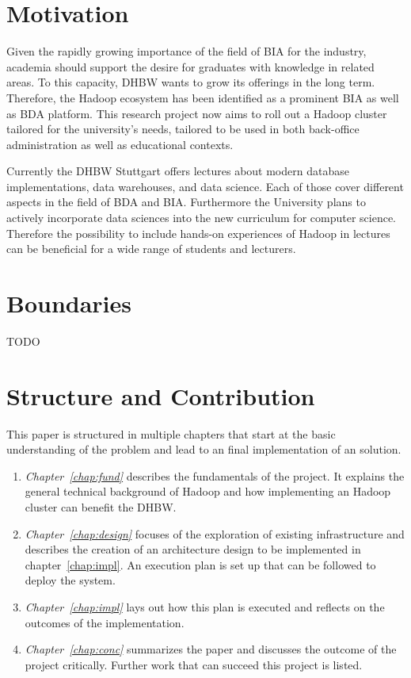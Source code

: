 \section{Motivation}
\label{sec:intro:motivation}

Given the rapidly growing importance of the field of \ac{BIA} for the industry, academia
should support the desire for graduates with knowledge in related areas. To this capacity,
\ac{DHBW} wants to grow its offerings in the long term. Therefore, the Hadoop ecosystem has
been identified as a prominent \ac{BIA} as well as \ac{BDA} platform. This research project now
aims to roll out a Hadoop cluster tailored for the university’s needs, tailored to be used in
both back-office administration as well as educational contexts.

Currently the \ac{DHBW} Stuttgart offers lectures about modern database implementations, 
data warehouses, and data science. Each of those cover different aspects in the field of \ac{BDA} and \ac{BIA}. Furthermore the University plans to actively incorporate data sciences into the new curriculum for computer science.
Therefore the possibility to include hands-on experiences of Hadoop in lectures can be beneficial for a wide range of students and lecturers.

\section{Boundaries}
\label{sec:intro:boundaries}

TODO

\section{Structure and Contribution}
\label{sec:intro:structure}

This paper is structured in multiple chapters that start at the basic understanding of the problem 
and lead to an final implementation of an solution.

\begin{enumerate}
    \item \emph{Chapter~\ref{chap:fund}} describes the fundamentals of the project. 
        It explains the general technical background of Hadoop 
        and how implementing an Hadoop cluster can benefit the \ac{DHBW}. 
    \item \emph{Chapter~\ref{chap:design}} focuses of the exploration of existing
        infrastructure and describes the creation of an architecture design 
        to be implemented in chapter~\ref{chap:impl}. 
        An execution plan is set up that can be followed to deploy the system.
    \item \emph{Chapter~\ref{chap:impl}} lays out how this plan is executed 
        and reflects on the outcomes of the implementation. 
    \item \emph{Chapter~\ref{chap:conc}} summarizes the paper 
        and discusses the outcome of the project critically.
        Further work that can succeed this project is listed.
\end{enumerate}

